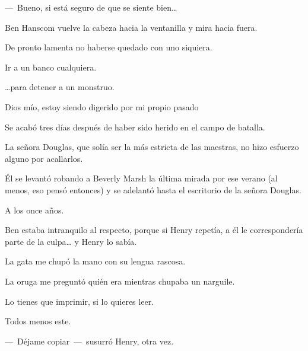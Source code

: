 \sk
---~Bueno, si está seguro de que se siente
bien\ldots{} 

\sk
Ben Hanscom vuelve la cabeza hacia la
ventanilla y mira hacia fuera. 

\sk
De pronto lamenta
no haberse quedado con uno siquiera. 

\sk
Ir a un banco cualquiera. 

\sk
\ldots{}para detener a un monstruo. 

\sk
Dios mío, estoy siendo digerido por mi
propio pasado 

\sk
Se acabó tres días después de haber sido herido en el campo de batalla. 

\sk
La señora Douglas, que solía ser la más
estricta de las maestras, no hizo esfuerzo alguno
por acallarlos. 

\sk
Él se levantó robando a Beverly Marsh la
última mirada por ese verano (al menos, eso pensó
entonces) y se adelantó hasta el escritorio de la
señora Douglas. 

\sk
A los once años. 

\sk
Ben estaba intranquilo al respecto, porque
si Henry repetía, a él le correspondería parte de la
culpa\ldots{} y Henry lo sabía.

\sk
La gata me chupó la mano con su lengua rascosa. 

\sk
La oruga me preguntó quién era mientras chupaba un narguile. 

\sk
Lo tienes que imprimir, si lo quieres leer. 

\sk
Todos menos este. 

\sk
---~Déjame copiar~---~susurró Henry, otra vez.

